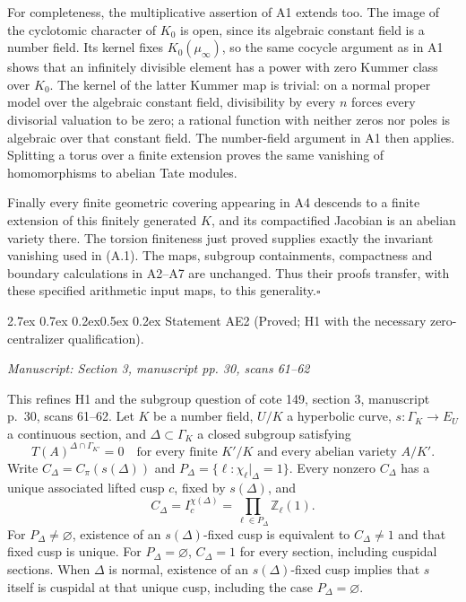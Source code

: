 \documentclass[11pt,a4paper]{article}
\makeatletter
\newcommand{\passage}[1]{\par\smallskip\noindent\textit{Manuscript: #1}\par\smallskip}
\renewcommand\paragraph{\@startsection{paragraph}{4}{\z@}%
  {2.7ex \@plus 0.7ex \@minus 0.2ex}{0.5ex \@plus 0.2ex}%
  {\normalfont\normalsize\bfseries}}
\makeatother
\begin{document}
For completeness, the multiplicative assertion of A1 extends too. The image of the cyclotomic character of $K_0$ is open, since its algebraic constant field is a number field. Its kernel fixes $K_0(\mu_\infty)$, so the same cocycle argument as in A1 shows that an infinitely divisible element has a power with zero Kummer class over $K_0$. The kernel of the latter Kummer map is trivial: on a normal proper model over the algebraic constant field, divisibility by every $n$ forces every divisorial valuation to be zero; a rational function with neither zeros nor poles is algebraic over that constant field. The number-field argument in A1 then applies. Splitting a torus over a finite extension proves the same vanishing of homomorphisms to abelian Tate modules.

Finally every finite geometric covering appearing in A4 descends to a finite extension of this finitely generated $K$, and its compactified Jacobian is an abelian variety there. The torsion finiteness just proved supplies exactly the invariant vanishing used in (A.1). The maps, subgroup containments, compactness and boundary calculations in A2--A7 are unchanged. Thus their proofs transfer, with these specified arithmetic input maps, to this generality.\hfill$\square$

\paragraph{Statement AE2 (Proved; H1 with the necessary zero-centralizer qualification).}\label{res:AE2}
\passage{Section 3, manuscript pp. 30, scans 61–62}

This refines H1 and the subgroup question of cote 149, section 3, manuscript p.~30, scans 61--62.
Let $K$ be a number field, $U/K$ a hyperbolic curve, $s:\Gamma_K\to E_U$ a continuous section, and $\Delta\subset\Gamma_K$ a closed subgroup satisfying
\[
 T(A)^{\Delta\cap\Gamma_{K'}}=0
 \quad\text{for every finite }K'/K\text{ and every abelian variety }A/K'.\tag{E.1}
\]
Write $C_\Delta=C_\pi(s(\Delta))$ and
$P_\Delta=\{\ell:\chi_\ell|_\Delta=1\}$. Every nonzero $C_\Delta$ has a unique associated lifted cusp $c$, fixed by $s(\Delta)$, and
\[
 C_\Delta=I_c^{\chi(\Delta)}
 =\prod_{\ell\in P_\Delta}\mathbb Z_\ell(1).
\]
For $P_\Delta\ne\varnothing$, existence of an $s(\Delta)$-fixed cusp is equivalent to $C_\Delta\ne1$ and that fixed cusp is unique. For $P_\Delta=\varnothing$, $C_\Delta=1$ for every section, including cuspidal sections. When $\Delta$ is normal, existence of an $s(\Delta)$-fixed cusp implies that $s$ itself is cuspidal at that unique cusp, including the case $P_\Delta=\varnothing$.
\end{document}
